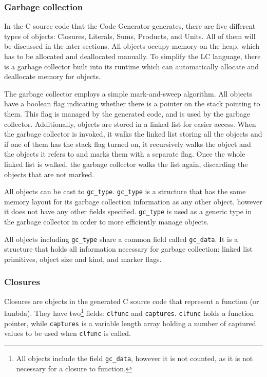 \documentclass[12pt]{article}
\begin{document}
\subsubsection{Garbage collection}

In the C source code that the Code Generator generates, there are five different
types of objects: Closures, Literals, Sums, Products, and Units. All of them
will be discussed in the later sections. All objects occupy memory on the heap,
which has to be allocated and deallocated manually. To simplify the LC language,
there is a garbage collector built into its runtime which can automatically
allocate and deallocate memory for objects. 

The garbage collector employs a simple mark-and-sweep algorithm. All objects
have a boolean flag indicating whether there is a pointer on the stack pointing
to them. This flag is managed by the generated code, and is used by the garbage
collector. Additionally, objects are stored in a linked list for easier access.
When the garbage collector is invoked, it walks the linked list storing all the
objects and if one of them has the stack flag turned on, it recursively walks
the object and the objects it refers to and marks them with a separate flag.
Once the whole linked list is walked, the garbage collector walks the list
again, discarding the objects that are not marked.

All objects can be cast to \verb$gc_type$. \verb$gc_type$ is a structure that
has the same memory layout for its garbage collection information as any other
object, however it does not have any other fields specified. \verb$gc_type$ is
used as a generic type in the garbage collector in order to more efficiently
manage objects.

All objects including \verb$gc_type$ share a common field called
\verb$gc_data$. It is a structure that holds all information necessary for
garbage collection: linked list primitives, object size and kind, and marker
flags.

\subsubsection{Closures}

Closures are objects in the generated C source code that represent a function
(or lambda). They have two\footnote{All objects include the field
\texttt{gc\_data}, however it is not counted, as it is not necessary for a
closure to function.} fields: \verb$clfunc$ and \verb$captures$. \verb$clfunc$
holds a function pointer, while \verb$captures$ is a variable length array
holding a number of captured values to be used when \verb$clfunc$ is called.
\end{document}
